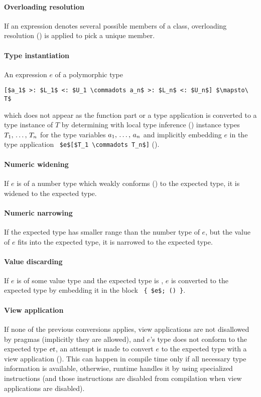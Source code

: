 \paragraph{Overloading resolution}
If an expression denotes several possible members of a class, overloading resolution () is applied to pick a unique member. 

\paragraph{Type instantiation}
An expression $e$ of a polymorphic type
\begin{lstlisting}
[$a_1$ >: $L_1$ <: $U_1 \commadots a_n$ >: $L_n$ <: $U_n$] $\mapsto\ T$
\end{lstlisting}
which does not appear as the function part or a type application is converted to a type instance of $T$ by determining with local type inference () instance types $T_1 ,\, \ldots ,\, T_n$ for the type variables $a_1 ,\, \ldots ,\, a_n$ and implicitly embedding $e$ in the type application ~\lstinline!$e$[$T_1 \commadots T_n$]! (). 

\paragraph{Numeric widening}
If $e$ is of a number type which weakly conforms () to the expected type, it is widened to the expected type. 

\paragraph{Numeric narrowing}
If the expected type has smaller range than the number type of $e$, but the value of $e$ fits into the expected type, it is narrowed to the expected type. 

\paragraph{Value discarding}
If $e$ is of some value type and the expected type is , $e$ is converted to the expected type by embedding it in the block ~\lstinline!{ $e$; () }!. 

\paragraph{View application}
If none of the previous conversions applies, view applications are not disallowed by pragmas (implicitly they are allowed), and $e$'s type does not conform to the expected type $\mbox{\sl et}$, an attempt is made to convert $e$ to the expected type with a view application (). This can happen in compile time only if all necessary type information is available, otherwise, runtime handles it by using specialized instructions (and those instructions are disabled from compilation when view applications are disabled). 

